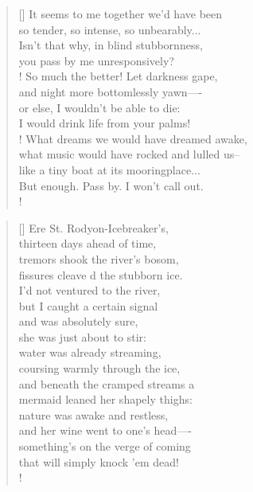 \documentclass[]{article}
\begin{document}
\settowidth{\versewidth}{It seems to me together we'd have been }
\begin{verse}[\versewidth]
It seems to me together we'd have been\\
so tender, so intense, so unbearably...\\
Isn't that why, in blind stubbornness,\\
you pass by me unresponsively?\\!
So much the better! Let darkness gape,\\
and night more bottomlessly yawn—- \\
or else, I wouldn't be able to die:\\
I would drink life from your palms!\\!
What dreams we would have dreamed awake,\\
what music would have rocked and lulled us-- \\
like a tiny boat at its mooringplace... \\
But enough. Pass by. I won't call out.\\!
\end{verse}
\newpage 

\vspace*{0.03\textheight}
\settowidth{\versewidth}{Ere St. Rodyon-Icebreaker's,  }
\begin{verse}[\versewidth]
Ere St. Rodyon-Icebreaker's,\\
thirteen days ahead of time,\\
tremors shook the river's bosom,\\
fissures cleave d the stubborn ice.\\
I'd not ventured to the river,\\
but I caught a certain signal\\
and was absolutely sure,\\
she was just about to stir:\\
water was already streaming,\\
coursing warmly through the ice,\\
and beneath the cramped streams a\\
mermaid leaned her shapely thighs:\\
nature was awake and restless,\\
and her wine went to one's head—- \\
something's on the verge of coming\\
that will simply knock 'em dead!\\!
\end{verse}
\bigskip \bigskip \bigskip
\end{document}
